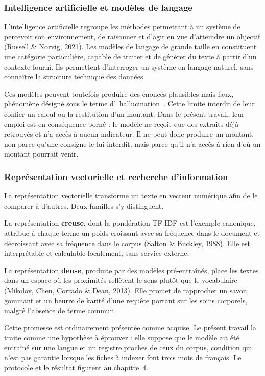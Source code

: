 \subsubsection{Intelligence artificielle et modèles de langage}

L'intelligence artificielle regroupe les méthodes permettant à un système de percevoir son environnement, de raisonner et d'agir en vue d'atteindre un objectif (Russell \& Norvig, 2021). Les modèles de langage de grande taille en constituent une catégorie particulière, capable de traiter et de générer du texte à partir d'un contexte fourni. Ils permettent d'interroger un système en langage naturel, sans connaître la structure technique des données.

Ces modèles peuvent toutefois produire des énoncés plausibles mais faux, phénomène désigné sous le terme d'\guillemotleft~hallucination~\guillemotright. Cette limite interdit de leur confier un calcul ou la restitution d'un montant. Dans le présent travail, leur emploi est en conséquence borné : le modèle ne reçoit que des extraits déjà retrouvés et n'a accès à aucun indicateur. Il ne peut donc produire un montant, non parce qu'une consigne le lui interdit, mais parce qu'il n'a accès à rien d'où un montant pourrait venir.

\subsubsection{Représentation vectorielle et recherche d'information}

La représentation vectorielle transforme un texte en vecteur numérique afin de le comparer à d'autres. Deux familles s'y distinguent.

La représentation \textbf{creuse}, dont la pondération TF-IDF est l'exemple canonique, attribue à chaque terme un poids croissant avec sa fréquence dans le document et décroissant avec sa fréquence dans le corpus (Salton \& Buckley, 1988). Elle est interprétable et calculable localement, sans service externe.

La représentation \textbf{dense}, produite par des modèles pré-entraînés, place les textes dans un espace où les proximités reflètent le sens plutôt que le vocabulaire (Mikolov, Chen, Corrado \& Dean, 2013). Elle promet de rapprocher un savon gommant et un beurre de karité d'une requête portant sur les soins corporels, malgré l'absence de terme commun.

Cette promesse est ordinairement présentée comme acquise. Le présent travail la traite comme une hypothèse à éprouver : elle suppose que le modèle ait été entraîné sur une langue et un registre proches de ceux du corpus, condition qui n'est pas garantie lorsque les fiches à indexer font trois mots de français. Le protocole et le résultat figurent au chapitre~4.

